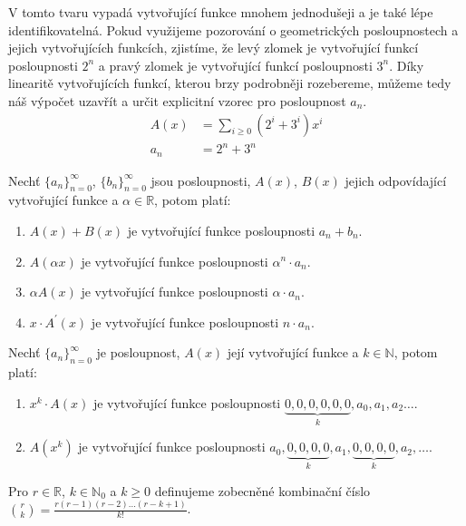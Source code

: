 \begin{t_example}
  V tomto tvaru vypadá vytvořující funkce mnohem jednodušeji a je také lépe identifikovatelná. Pokud využijeme pozorování o geometrických posloupnostech a jejich vytvořujících funkcích, zjistíme, že levý zlomek je vytvořující funkcí posloupnosti $2^n$ a pravý zlomek je vytvořující funkcí posloupnosti $3^n$. Díky linearitě vytvořujících funkcí, kterou brzy podrobněji rozebereme, můžeme tedy náš výpočet uzavřít a určit explicitní vzorec pro posloupnost $a_n$.
  \begin{align*}
    A(x) &= \sum_{i\geq 0}(2^i+3^i)x^i\\
    a_n&=2^n+3^n
  \end{align*}
\end{t_example}

\begin{t_fact}
  Nechť $\{a_n\}_{n=0}^\infty$, $\{b_n\}_{n=0}^\infty$ jsou posloupnosti, $A(x)$, $B(x)$ jejich odpovídající vytvořující funkce a $\alpha\in\mathbb{R}$, potom platí:
  \begin{enumerate}
    \item $A(x)+B(x)$ je vytvořující funkce posloupnosti $a_n+b_n$.
    \item $A(\alpha x)$ je vytvořující funkce posloupnosti $\alpha^n\cdot a_n$.
    \item $\alpha A(x)$ je vytvořující funkce posloupnosti $\alpha\cdot a_n$.
    \item $x\cdot A^\prime(x)$ je vytvořující funkce posloupnosti $n\cdot a_n$.
  \end{enumerate}   
 \end{t_fact}
 
\begin{t_fact}
  Nechť $\{a_n\}_{n=0}^\infty$ je posloupnost, $A(x)$ její vytvořující funkce a $k \in\mathbb{N}$, potom platí:
  \begin{enumerate}
    \item $x^k\cdot A(x)$ je vytvořující funkce posloupnosti $\underbrace{0, 0, 0, 0, 0, 0}_{k}, a_0, a_1, a_2\dots$.
    \item $A(x^k)$ je vytvořující funkce posloupnosti $a_0, \underbrace{0, 0, 0, 0}_{k}, a_1, \underbrace{0, 0, 0, 0}_{k}, a_2,\dots$.
  \end{enumerate}
\end{t_fact}

\begin{t_definition}
  Pro $r\in\mathbb{R}$, $k\in\mathbb{N}_0$ a $k\geq 0$ definujeme zobecněné kombinační číslo $\binom{r}{k}=\frac{r(r-1)(r-2)\dots (r-k+1)}{k!}$.
\end{t_definition}

